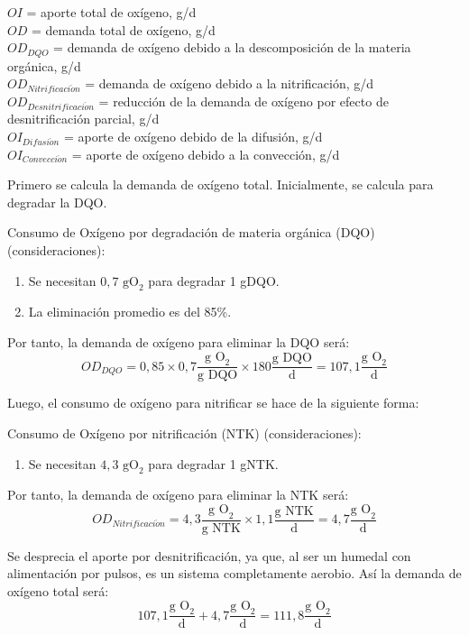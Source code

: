 \documentclass[12pt, letterpaper]{report}
\begin{document}
$OI$ = aporte total de oxígeno, g/d \\
$OD$ = demanda total de oxígeno, g/d \\
$OD_{DQO}$ = demanda de oxígeno debido a la descomposición de la materia orgánica, g/d \\
$OD_{Nitrificaci\acute{o}n}$ = demanda de oxígeno debido a la nitrificación, g/d \\
$OD_{Desnitrificaci\acute{o}n}$ = reducción de la demanda de oxígeno por efecto de desnitrificación parcial, g/d \\
$OI_{Difusi\acute{o}n}$ = aporte de oxígeno debido de la difusión, g/d \\
$OI_{Convecci\acute{o}n}$ = aporte de oxígeno debido a la convección, g/d

Primero se calcula la demanda de oxígeno total. Inicialmente, se calcula para degradar la DQO.

Consumo de Oxígeno por degradación de materia orgánica (DQO) (consideraciones):
\begin{enumerate}
    \item Se necesitan $0,7\text{ gO}_2$ para degradar 1 gDQO.
    \item La eliminación promedio es del 85\%.
\end{enumerate}

Por tanto, la demanda de oxígeno para eliminar la DQO será:
\begin{equation*}
OD_{DQO} = 0,85 \times 0,7 \frac{\text{g O}_2}{\text{g DQO}} \times 180 \frac{\text{g DQO}}{\text{d}} = 107,1 \frac{\text{g O}_2}{\text{d}}
\end{equation*}

Luego, el consumo de oxígeno para nitrificar se hace de la siguiente forma:

Consumo de Oxígeno por nitrificación (NTK) (consideraciones):
\begin{enumerate}
    \item Se necesitan $4,3\text{ gO}_2$ para degradar 1 gNTK.
\end{enumerate}

Por tanto, la demanda de oxígeno para eliminar la NTK será:
\begin{equation*}
OD_{Nitrificaci\acute{o}n} = 4,3 \frac{\text{g O}_2}{\text{g NTK}} \times 1,1 \frac{\text{g NTK}}{\text{d}} = 4,7 \frac{\text{g O}_2}{\text{d}}
\end{equation*}

Se desprecia el aporte por desnitrificación, ya que, al ser un humedal con alimentación por pulsos, es un sistema completamente aerobio. Así la demanda de oxígeno total será:
\begin{equation*}
107,1 \frac{\text{g O}_2}{\text{d}} + 4,7 \frac{\text{g O}_2}{\text{d}} = 111,8 \frac{\text{g O}_2}{\text{d}}
\end{equation*}
\end{document}
